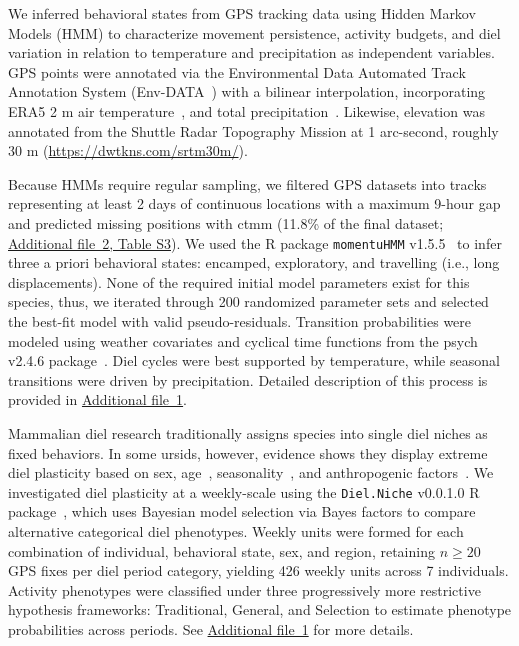 \documentclass[lineno,referee,pdflatex,sn-vancouver-num]{sn-jnl}%
\theoremstyle{thmstyleone}%
\theoremstyle{thmstyletwo}%
\theoremstyle{thmstylethree}%
\begin{document}
We inferred behavioral states from GPS tracking data using Hidden Markov Models (HMM) to characterize movement persistence, activity budgets, and diel variation in relation to temperature and precipitation as independent variables.
GPS points were annotated via the Environmental Data Automated Track Annotation System (Env-DATA~\cite{dodgeEnvironmentaldataAutomatedTrack2013}) with a bilinear interpolation, incorporating ERA5 2 m air temperature~\cite{Hersbach2023ERA5temperature}, and total precipitation~\cite{MunozSabater2019ERA5precipitation}. Likewise, elevation was annotated from the Shuttle Radar Topography Mission at 1 arc-second, roughly 30 m (\url{https://dwtkns.com/srtm30m/}).

Because HMMs require regular sampling, we filtered GPS datasets into tracks representing at least 2 days of continuous locations with a maximum 9-hour gap and predicted missing positions with ctmm (11.8\% of the final dataset; \hyperref[S1_File]{Additional file~2, Table S3}). We used the R package \texttt{momentuHMM} v1.5.5~\cite{mcclintockMomentuHMMPackageGeneralized2018} to infer three a priori behavioral states: encamped, exploratory, and travelling (i.e., long displacements). None of the required initial model parameters exist for this species, thus, we iterated through 200 randomized parameter sets and selected the best-fit model with valid pseudo-residuals. Transition probabilities were modeled using weather covariates and cyclical time functions from the psych v2.4.6 package~\cite{revellePsychProceduresPsychological2007}. Diel cycles were best supported by temperature, while seasonal transitions were driven by precipitation. Detailed description of this process is provided in \hyperref[S1_File]{Additional file~1}.

Mammalian diel research traditionally assigns species into single diel niches as fixed behaviors. In some ursids, however, evidence shows they display extreme diel plasticity based on sex, age~\cite{kawamuraDielMonthlyActivity2022}, seasonality~\cite{lewisActivityPatternsBlack2011}, and anthropogenic factors~\cite{lewisActivityPatternsBlack2011,kawamuraDielMonthlyActivity2022,donatelliCircadianActivitySmall2022}. We investigated diel plasticity at a weekly-scale using the \texttt{Diel.Niche} v0.0.1.0 R package~\cite{gerberModelbasedHypothesisFramework2024}, which uses Bayesian model selection via Bayes factors to compare alternative categorical diel phenotypes. Weekly units were formed for each combination of individual, behavioral state, sex, and region, retaining $n \geq 20$ GPS fixes per diel period category, yielding 426 weekly units across 7 individuals.
Activity phenotypes were classified under three progressively more restrictive hypothesis frameworks: Traditional, General, and Selection to estimate phenotype probabilities across periods. See \hyperref[S1_File]{Additional file~1} for more details.
\end{document}
